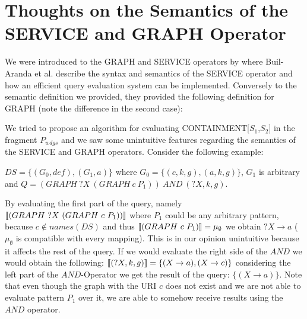 		\section{Thoughts on the Semantics of the SERVICE and GRAPH Operator}
		We were introduced to the GRAPH and
		SERVICE operators by \cite{builaranda20131} where Buil-Aranda et al.
		describe the syntax and semantics of the SERVICE operator and how an efficient query
		evaluation system can be implemented. 
		Conversely to the semantic definition we provided, they provided the
		following definition for GRAPH (note the difference in the second case):	


			We tried to propose an algorithm for evaluating CONTAINMENT[$S_1$,$S_2$] in the
			fragment $P_{wdgs}$ and we saw some unintuitive features regarding the semantics of the
			SERVICE and GRAPH operators. Consider the following example:
			\begin{example}
				$DS=\{(G_0,def), (G_1,a) \}$ where $G_0 = \{
				(c,k,g), (a,k,g) \}$, $G_1$ is arbitrary and  $Q = (GRAPH \ ?X  \ (GRAPH  \ c \  P_1)) \ AND \ (?X,k,g)$.
			\end{example}

			By evaluating the first part of the query, namely $\llbracket (GRAPH \ ?X  \ (GRAPH  \
			c \  P_1)) \rrbracket$ where $P_1$ could be any arbitrary pattern, because $c \notin
			names(DS)$ and thus $\llbracket (GRAPH \ c  \ P_1) \rrbracket = \mu_\emptyset$  we obtain $?X
			\rightarrow a$ ($\mu_\emptyset$ is compatible with every mapping). This is in
			our opinion unintuitive because it affects the rest of the query.
			If we would evaluate the right side of the $AND$ we would obtain the following: $\llbracket(?X,k,g)\rrbracket = \{ (X \rightarrow a) , (X \rightarrow c) \}$ considering the
			left part of the $AND$-Operator we get the result of the query: $\{ (X \rightarrow a )
			\}$. Note that even though the graph with the URI $c$ does not exist and we are not able
			to evaluate pattern $P_1$ over it, we are able to somehow receive results using
			the $AND$ operator.
			\bigskip

